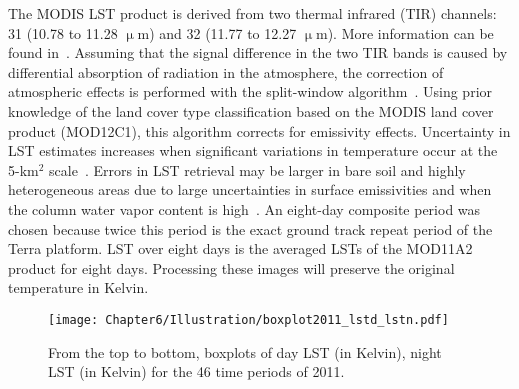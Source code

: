 
The MODIS LST product is derived from two thermal infrared (TIR) channels: 31 (10.78 to 11.28 $\upmu$m) and 32 (11.77 to 12.27 $\upmu$m). More information can be found in~\cite{benali2012estimating}.
Assuming that the signal difference in the two TIR bands is caused by differential absorption
of radiation in the atmosphere, the correction of atmospheric effects is performed with the split-window algorithm~\citep{wan1996generalized}.
Using prior knowledge of the land cover type classification based on the MODIS land cover product (MOD12C1), this algorithm corrects for emissivity effects. %
Uncertainty in LST estimates increases when significant variations in temperature occur at the 5-km$^2$ scale~\cite{wan1997physics}. %
Errors in LST retrieval may be larger in bare soil and highly heterogeneous areas due to large uncertainties in surface emissivities and when the column water vapor content is high~\citep{wan1997physics}.
An eight-day composite period was chosen because twice this period is the exact ground track repeat period of the Terra platform. LST over eight days is the averaged LSTs of the MOD11A2 product for eight days. Processing these images will preserve the original temperature in Kelvin.

\begin{figure}[ht]
 \centering
  \texttt{[image: Chapter6/Illustration/boxplot2011\_lstd\_lstn.pdf]}

  \caption{From the top to bottom, boxplots of day LST (in Kelvin), night LST (in Kelvin) for the 46 time periods of 2011.}
\label{boxplot2011LST}
\end{figure}

